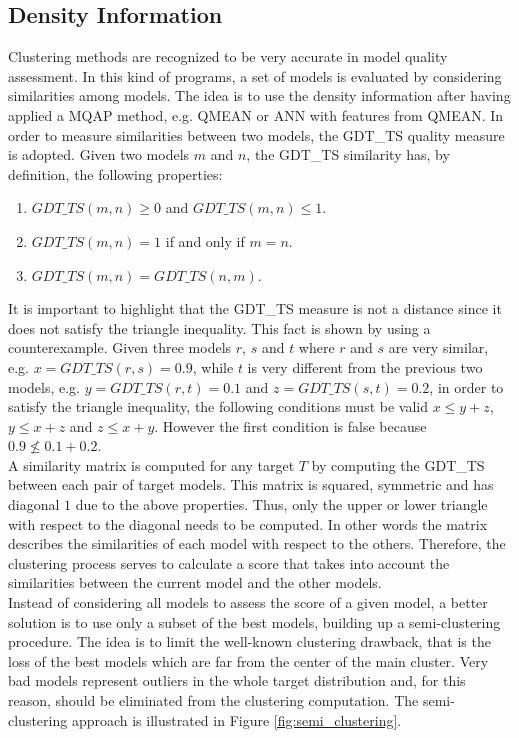 \subsection{Density Information}
\label{subsec:density_information}
Clustering methods are recognized to be very accurate in model quality assessment. In this kind of programs, a set of models is evaluated by considering similarities among models. The idea is to use the density information after having applied a MQAP method, e.g. QMEAN or ANN with features from QMEAN. In order to measure similarities between two models, the GDT\_TS quality measure is adopted. Given two models $m$ and $n$, the GDT\_TS similarity has, by definition, the following properties:
\begin{enumerate}
 \item $GDT\_TS(m, n) \geq 0$ and $GDT\_TS(m, n) \leq 1$.
 \item $GDT\_TS(m, n) = 1$ if and only if $m = n$.
 \item $GDT\_TS(m, n) = GDT\_TS(n, m)$.
\end{enumerate}
It is important to highlight that the GDT\_TS measure is not a distance since it does not satisfy the triangle inequality. This fact is shown by using a counterexample. Given three models $r$, $s$ and $t$ where $r$ and $s$ are very similar, e.g. $x = GDT\_TS(r, s) = 0.9$, while $t$ is very different from the previous two models, e.g. $y = GDT\_TS(r, t) = 0.1$ and $z = GDT\_TS(s, t) = 0.2$, in order to satisfy the triangle inequality, the following conditions must be valid $x \leq y + z$, $y \leq x + z$ and $z \leq x + y$. However the first condition is false because $0.9 \nleq 0.1 + 0.2$.\\
A similarity matrix is computed for any target $T$ by computing the GDT\_TS between each pair of target models. This matrix is squared, symmetric and has diagonal $1$ due to the above properties. Thus, only the upper or lower triangle with respect to the diagonal needs to be computed. In other words the matrix describes the similarities of each model with respect to the others. Therefore, the clustering process serves to calculate a score that takes into account the similarities between the current model and the other models. \\
Instead of considering all models to assess the score of a given model, a better solution is to use only a subset of the best models, building up a semi-clustering procedure. The idea is to limit the well-known clustering drawback, that is the loss of the best models which are far from the center of the main cluster. Very bad models represent outliers in the whole target distribution and, for this reason, should be eliminated from the clustering computation. The semi-clustering approach is illustrated in Figure \ref{fig:semi_clustering}.\\
